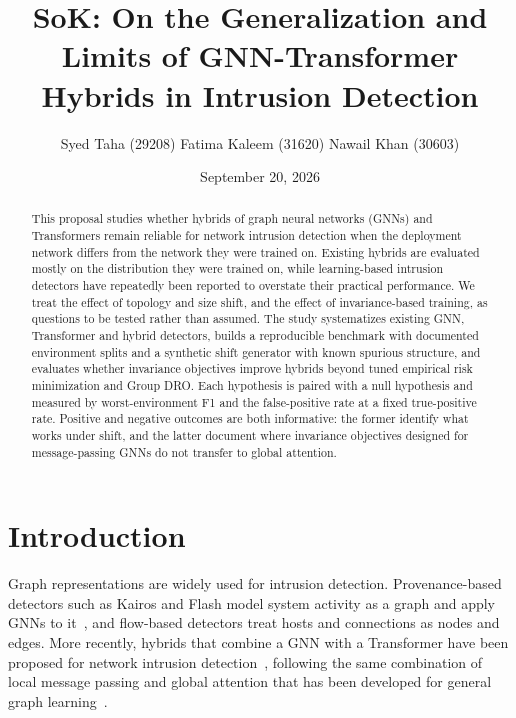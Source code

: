 \documentclass[a4paper,10pt]{article}
\title{SoK: On the Generalization and Limits of GNN-Transformer Hybrids in Intrusion Detection}
\subtitle{}
\author{Syed Taha (29208) \hspace{3em} Fatima Kaleem (31620) \hspace{3em} Nawail Khan (30603)}
\date{September 20, 2026}
\begin{document}
\maketitle

\begin{abstract}
This proposal studies whether hybrids of graph neural networks (GNNs) and Transformers remain reliable for network intrusion detection when the deployment network differs from the network they were trained on. Existing hybrids are evaluated mostly on the distribution they were trained on, while learning-based intrusion detectors have repeatedly been reported to overstate their practical performance. We treat the effect of topology and size shift, and the effect of invariance-based training, as questions to be tested rather than assumed. The study systematizes existing GNN, Transformer and hybrid detectors, builds a reproducible benchmark with documented environment splits and a synthetic shift generator with known spurious structure, and evaluates whether invariance objectives improve hybrids beyond tuned empirical risk minimization and Group DRO. Each hypothesis is paired with a null hypothesis and measured by worst-environment F1 and the false-positive rate at a fixed true-positive rate. Positive and negative outcomes are both informative: the former identify what works under shift, and the latter document where invariance objectives designed for message-passing GNNs do not transfer to global attention.
\end{abstract}

\tableofcontents
\newpage


\section{Introduction}

Graph representations are widely used for intrusion detection. Provenance-based detectors such as Kairos and Flash model system activity as a graph and apply GNNs to it~\cite{cheng2024kairos,rehman2024flash}, and flow-based detectors treat hosts and connections as nodes and edges. More recently, hybrids that combine a GNN with a Transformer have been proposed for network intrusion detection~\cite{xie2026hybrid,appiahene2026hybrid,zhang2024icist}, following the same combination of local message passing and global attention that has been developed for general graph learning~\cite{rampasek2022graphgps,shirzad2023exphormer}.
\end{document}
